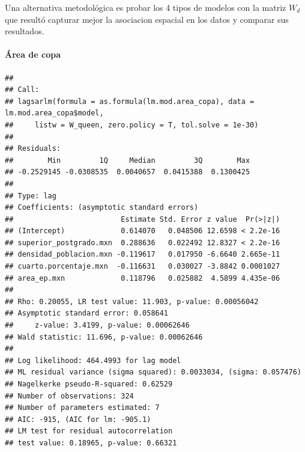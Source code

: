 \documentclass[12pt,]{book}
\newenvironment{Shaded}{\begin{snugshade}}{\end{snugshade}}
\newcommand{\KeywordTok}[1]{\textcolor[rgb]{0.13,0.29,0.53}{\textbf{#1}}}
\newcommand{\DataTypeTok}[1]{\textcolor[rgb]{0.13,0.29,0.53}{#1}}
\newcommand{\FloatTok}[1]{\textcolor[rgb]{0.00,0.00,0.81}{#1}}
\newcommand{\StringTok}[1]{\textcolor[rgb]{0.31,0.60,0.02}{#1}}
\newcommand{\CommentTok}[1]{\textcolor[rgb]{0.56,0.35,0.01}{\textit{#1}}}
\newcommand{\OperatorTok}[1]{\textcolor[rgb]{0.81,0.36,0.00}{\textbf{#1}}}
\newcommand{\NormalTok}[1]{#1}
\let\oldparagraph\paragraph
\renewcommand{\paragraph}[1]{\oldparagraph{#1}\mbox{}}
\begin{document}
Una alternativa metodológica es probar los 4 tipos de modelos con la
matriz \(W_d\) que resultó capturar mejor la asociacion espacial en los
datos y comparar sus resultados.

\paragraph{Área de copa}\label{area-de-copa}

\begin{Shaded}
\end{Shaded}

\begin{verbatim}
## 
## Call:
## lagsarlm(formula = as.formula(lm.mod.area_copa), data = lm.mod.area_copa$model, 
##     listw = W_queen, zero.policy = T, tol.solve = 1e-30)
## 
## Residuals:
##        Min         1Q     Median         3Q        Max 
## -0.2529145 -0.0308535  0.0040657  0.0415388  0.1300425 
## 
## Type: lag 
## Coefficients: (asymptotic standard errors) 
##                         Estimate Std. Error z value  Pr(>|z|)
## (Intercept)             0.614070   0.048506 12.6598 < 2.2e-16
## superior_postgrado.mxn  0.288636   0.022492 12.8327 < 2.2e-16
## densidad_poblacion.mxn -0.119617   0.017950 -6.6640 2.665e-11
## cuarto.porcentaje.mxn  -0.116631   0.030027 -3.8842 0.0001027
## area_ep.mxn             0.118796   0.025882  4.5899 4.435e-06
## 
## Rho: 0.20055, LR test value: 11.903, p-value: 0.00056042
## Asymptotic standard error: 0.058641
##     z-value: 3.4199, p-value: 0.00062646
## Wald statistic: 11.696, p-value: 0.00062646
## 
## Log likelihood: 464.4993 for lag model
## ML residual variance (sigma squared): 0.0033034, (sigma: 0.057476)
## Nagelkerke pseudo-R-squared: 0.62529 
## Number of observations: 324 
## Number of parameters estimated: 7 
## AIC: -915, (AIC for lm: -905.1)
## LM test for residual autocorrelation
## test value: 0.18965, p-value: 0.66321
\end{verbatim}
\end{document}
